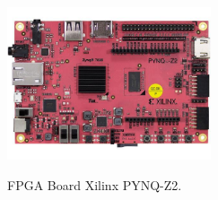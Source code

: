 \begin{afigure}
    \includegraphics[width=6cm, center]{images/pynq-z2.jpeg}
    \caption{FPGA Board Xilinx PYNQ-Z2.}
    \label{fig:pynq-z2}
\end{afigure}





